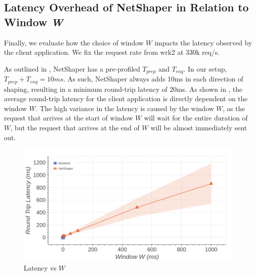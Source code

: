 \subsection{Latency Overhead of NetShaper in Relation to Window \textit{W}}
\label{subsec:netshaper-evaluation-latency}

Finally, we evaluate how the choice of window $W$ impacts the latency observed by the client application.
We fix the request rate from wrk2 at 330k req/s.

As outlined in , NetShaper has a pre-profiled $T_{prep}$ and $T_{enq}$.
In our setup, $T_{prep} + T_{enq} = 10ms$.
As such, NetShaper always adds 10ms in each direction of shaping, resulting in a minimum round-trip latency of 20ms.
As shown in , the average round-trip latency for the client application is directly dependent on the window $W$.
The high variance in the latency is caused by the window $W$, as the request that arrives at the start of window $W$ will wait for the entire duration of $W$, but the request that arrives at the end of $W$ will be almost immediately sent out.

\begin{figure}[!htb]
    \centering
    \includegraphics[width=\columnwidth]{figures/netshaper/evaluation/http_latency.png}
    \caption{Latency vs $W$}
    \label{fig:netshaper-eval-http-latency}
\end{figure}